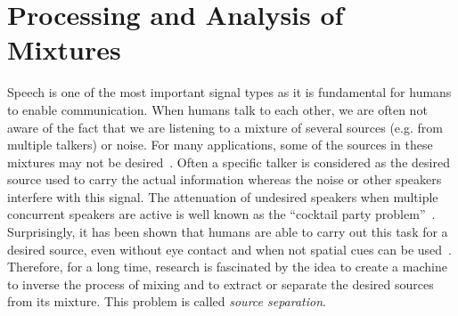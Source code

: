 \hypertarget{processing-and-analysis-of-mixtures}{%
\section{Processing and Analysis of Mixtures}\label{processing-and-analysis-of-mixtures}}

Speech is one of the most important signal types as it is fundamental for humans to enable communication.
When humans talk to each other, we are often not aware of the fact that we are listening to a mixture of several sources (e.g. from multiple talkers) or noise.
For many applications, some of the sources in these mixtures may not be desired~\cite{lorem}.
Often a specific talker is considered as the desired source used to carry the actual information whereas the noise or other speakers interfere with this signal.
The attenuation of undesired speakers when multiple concurrent speakers are active is well known as the ``cocktail party problem''~\cite{cherry53, haykin05}.
Surprisingly, it has been shown that humans are able to carry out this task for a desired source, even without eye contact and when not spatial cues can be used~\cite{bregman90}.
Therefore, for a long time, research is fascinated by the idea to create a machine to inverse the process of mixing  and to extract or separate the desired sources from its mixture.
This problem is called \emph{source separation}.

